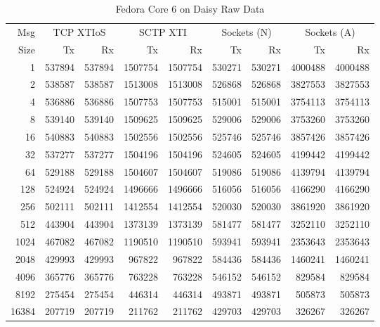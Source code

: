 \documentclass[letterpaper,final,notitlepage,twocolumn,10pt,twoside]{article}
\let\normalsize = \small
\let\small = \footnotesize
\let\footnotesize = \scriptsize
\let\scriptsize = \tiny
\begin{document}
\begin{appendix}
\begin{table}[hbp]
\footnotesize
\begin{center}
\setlength{\tabcolsep}{0.2em}
\setlength{\arraycolsep}{0.2em}
\begin{tabular}{rrrrrrrrr}\\
Msg & \multicolumn{2}{c}{TCP XTIoS} & \multicolumn{2}{c}{SCTP XTI} & \multicolumn{2}{c}{Sockets (N)} & \multicolumn{2}{c}{Sockets (A)}\\
Size & Tx & Rx & Tx & Rx & Tx & Rx & Tx & Rx\\
\hline
\hline
1 & 537894 & 537894 & 1507754 & 1507754 & 530271 & 530271 & 4000488 & 4000488\\
2 & 538587 & 538587 & 1513008 & 1513008 & 526868 & 526868 & 3827553 & 3827553\\
4 & 536886 & 536886 & 1507753 & 1507753 & 515001 & 515001 & 3754113 & 3754113\\
8 & 539140 & 539140 & 1509625 & 1509625 & 529006 & 529006 & 3753260 & 3753260\\
16 & 540883 & 540883 & 1502556 & 1502556 & 525746 & 525746 & 3857426 & 3857426\\
32 & 537277 & 537277 & 1504196 & 1504196 & 524605 & 524605 & 4199442 & 4199442\\
64 & 529188 & 529188 & 1504607 & 1504607 & 519086 & 519086 & 4139794 & 4139794\\
128 & 524924 & 524924 & 1496666 & 1496666 & 516056 & 516056 & 4166290 & 4166290\\
256 & 502111 & 502111 & 1412554 & 1412554 & 520030 & 520030 & 3861920 & 3861920\\
512 & 443904 & 443904 & 1373139 & 1373139 & 581477 & 581477 & 3252110 & 3252110\\
1024 & 467082 & 467082 & 1190510 & 1190510 & 593941 & 593941 & 2353643 & 2353643\\
2048 & 429993 & 429993 & 967822 & 967822 & 584436 & 584436 & 1460241 & 1460241\\
4096 & 365776 & 365776 & 763228 & 763228 & 546152 & 546152 & 829584 & 829584\\
8192 & 275454 & 275454 & 446314 & 446314 & 493871 & 493871 & 505873 & 505873\\
16384 & 207719 & 207719 & 211762 & 211762 & 429703 & 429703 & 326267 & 326267\\
\hline
\end{tabular}
\end{center}
\normalsize
\caption[Fedora Core 6 on Daisy Raw Data]{Fedora Core 6 on Daisy Raw Data}
\label{table:rh72data}
\end{table}


\end{appendix}
\end{document}
